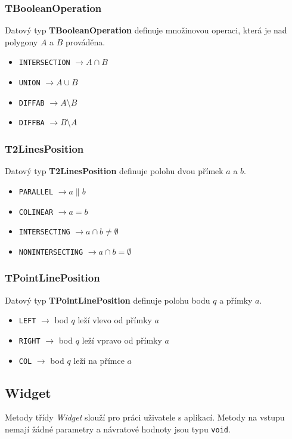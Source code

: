 \documentclass[a4paper, 12pt]{article}
\begin{document}
\subsubsection*{TBooleanOperation}
Datový typ \textbf{TBooleanOperation} definuje množinovou operaci, která je nad polygony $A$ a $B$ prováděna.\\ 
\begin{itemize}
\item \texttt{INTERSECTION} $\rightarrow A \cap B$ 
\item \texttt{UNION} $\rightarrow A \cup B$
\item \texttt{DIFFAB} $\rightarrow A$\textbackslash $B$
\item \texttt{DIFFBA} $\rightarrow B$\textbackslash $A$
\end{itemize}

\subsubsection*{T2LinesPosition}
Datový typ \textbf{T2LinesPosition} definuje polohu dvou přímek $a$ a $b$.\\  
\begin{itemize}
\item \texttt{PARALLEL} $\rightarrow a \parallel b$
\item \texttt{COLINEAR} $\rightarrow a = b$
\item \texttt{INTERSECTING} $\rightarrow a \cap b \neq \emptyset$
\item \texttt{NONINTERSECTING} $\rightarrow a \cap b = \emptyset$
\end{itemize}

\subsubsection*{TPointLinePosition}
Datový typ \textbf{TPointLinePosition} definuje polohu bodu $q$ a přímky $a$.\\   
\begin{itemize}
\item \texttt{LEFT} $\rightarrow$ bod $q$ leží vlevo od přímky $a$
\item \texttt{RIGHT} $\rightarrow$ bod $q$ leží vpravo od přímky $a$
\item \texttt{COL} $\rightarrow$ bod $q$ leží na přímce $a$
\end{itemize}




\subsection{Widget}
Metody třídy \textit{Widget} slouží pro práci uživatele s aplikací. Metody na vstupu nemají žádné parametry a návratové hodnoty jsou typu \texttt{void}.
\end{document}
